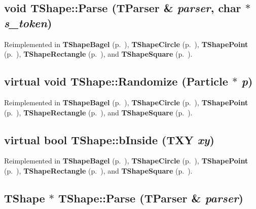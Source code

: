 \subsection{\setlength{\rightskip}{0pt plus 5cm}void TShape::Parse ({\bf TParser} \& {\em parser}, char $\ast$ {\em s\_\-token})\hspace{0.3cm}{\tt  [virtual]}}



Reimplemented in {\bf TShape\-Bagel} {\rm (p.~\pageref{TShapeBagel_a1})}, {\bf TShape\-Circle} {\rm (p.~\pageref{TShapeCircle_a1})}, {\bf TShape\-Point} {\rm (p.~\pageref{TShapePoint_a1})}, {\bf TShape\-Rectangle} {\rm (p.~\pageref{TShapeRectangle_a1})}, and {\bf TShape\-Square} {\rm (p.~\pageref{TShapeSquare_a1})}.\label{TShape_a1}
\subsection{\setlength{\rightskip}{0pt plus 5cm}virtual void TShape::Randomize ({\bf Particle} $\ast$ {\em p})\hspace{0.3cm}{\tt  [pure virtual]}}



Reimplemented in {\bf TShape\-Bagel} {\rm (p.~\pageref{TShapeBagel_a2})}, {\bf TShape\-Circle} {\rm (p.~\pageref{TShapeCircle_a2})}, {\bf TShape\-Point} {\rm (p.~\pageref{TShapePoint_a2})}, {\bf TShape\-Rectangle} {\rm (p.~\pageref{TShapeRectangle_a2})}, and {\bf TShape\-Square} {\rm (p.~\pageref{TShapeSquare_a2})}.\label{TShape_a2}
\subsection{\setlength{\rightskip}{0pt plus 5cm}virtual bool TShape::b\-Inside ({\bf TXY} {\em xy})\hspace{0.3cm}{\tt  [pure virtual]}}



Reimplemented in {\bf TShape\-Bagel} {\rm (p.~\pageref{TShapeBagel_a3})}, {\bf TShape\-Circle} {\rm (p.~\pageref{TShapeCircle_a3})}, {\bf TShape\-Point} {\rm (p.~\pageref{TShapePoint_a3})}, {\bf TShape\-Rectangle} {\rm (p.~\pageref{TShapeRectangle_a3})}, and {\bf TShape\-Square} {\rm (p.~\pageref{TShapeSquare_a3})}.\label{TShape_d0}
\subsection{\setlength{\rightskip}{0pt plus 5cm}TShape $\ast$ TShape::Parse ({\bf TParser} \& {\em parser})\hspace{0.3cm}{\tt  [static]}}

